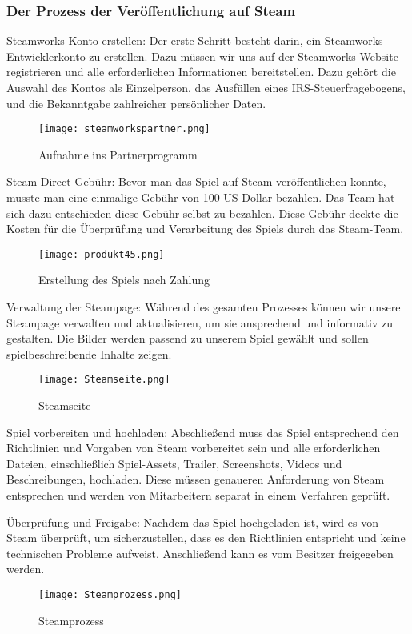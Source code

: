 \subsubsection{Der Prozess der Veröffentlichung auf Steam}\label{subsubsec:Veröffentlichungsprozess}

Steamworks-Konto erstellen: Der erste Schritt besteht darin, ein Steamworks-Entwicklerkonto zu erstellen. Dazu müssen wir uns auf der Steamworks-Website registrieren und alle erforderlichen Informationen bereitstellen. Dazu gehört die Auswahl des Kontos als Einzelperson, das Ausfüllen eines IRS-Steuerfragebogens, und die Bekanntgabe zahlreicher persönlicher Daten.
\begin{figure}[H]
    \texttt{[image: steamworkspartner.png]}
    \caption{Aufnahme ins Partnerprogramm}
\end{figure}

Steam Direct-Gebühr: Bevor man das Spiel auf Steam veröffentlichen konnte, musste man eine einmalige Gebühr von 100 US-Dollar bezahlen. Das Team hat sich dazu entschieden diese Gebühr selbst zu bezahlen. Diese Gebühr deckte die Kosten für die Überprüfung und Verarbeitung des Spiels durch das Steam-Team.
\begin{figure}[H]
    \texttt{[image: produkt45.png]}
    \caption{Erstellung des Spiels nach Zahlung}
\end{figure}

Verwaltung der Steampage: Während des gesamten Prozesses können wir unsere Steampage verwalten und aktualisieren, um sie ansprechend und informativ zu gestalten. Die Bilder werden passend zu unserem Spiel gewählt und sollen spielbeschreibende Inhalte zeigen.
\begin{figure}[H]
    \texttt{[image: Steamseite.png]}
    \caption{Steamseite}
\end{figure}

Spiel vorbereiten und hochladen: Abschließend muss das Spiel entsprechend den Richtlinien und Vorgaben von Steam vorbereitet sein und alle erforderlichen Dateien, einschließlich Spiel-Assets, Trailer, Screenshots, Videos und Beschreibungen, hochladen. Diese müssen genaueren Anforderung von Steam entsprechen und werden von Mitarbeitern separat in einem Verfahren geprüft.

Überprüfung und Freigabe: Nachdem das Spiel hochgeladen ist, wird es von Steam überprüft, um sicherzustellen, dass es den Richtlinien entspricht und keine technischen Probleme aufweist. Anschließend kann es vom Besitzer freigegeben werden.
\begin{figure}[H]
    \texttt{[image: Steamprozess.png]}
    \caption{Steamprozess}
\end{figure}

